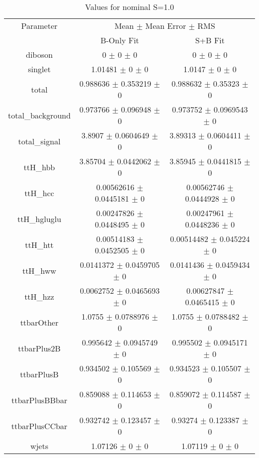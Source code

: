 \begin{table}
\centering
\caption{Values for nominal S=1.0}
\begin{tabular}{ccc}
\toprule
Parameter & \multicolumn{2}{c}{Mean $\pm$ Mean Error $\pm$ RMS}\\
 & B-Only Fit & S+B Fit\\
\midrule
diboson & \num{0} $\pm$ \num{0} $\pm$ \num{0} & \num{0} $\pm$ \num{0} $\pm$ \num{0}\\
singlet & \num{1.01481} $\pm$ \num{0} $\pm$ \num{0} & \num{1.0147} $\pm$ \num{0} $\pm$ \num{0}\\
total & \num{0.988636} $\pm$ \num{0.353219} $\pm$ \num{0} & \num{0.988632} $\pm$ \num{0.35323} $\pm$ \num{0}\\
total\_background & \num{0.973766} $\pm$ \num{0.096948} $\pm$ \num{0} & \num{0.973752} $\pm$ \num{0.0969543} $\pm$ \num{0}\\
total\_signal & \num{3.8907} $\pm$ \num{0.0604649} $\pm$ \num{0} & \num{3.89313} $\pm$ \num{0.0604411} $\pm$ \num{0}\\
ttH\_hbb & \num{3.85704} $\pm$ \num{0.0442062} $\pm$ \num{0} & \num{3.85945} $\pm$ \num{0.0441815} $\pm$ \num{0}\\
ttH\_hcc & \num{0.00562616} $\pm$ \num{0.0445181} $\pm$ \num{0} & \num{0.00562746} $\pm$ \num{0.0444928} $\pm$ \num{0}\\
ttH\_hgluglu & \num{0.00247826} $\pm$ \num{0.0448495} $\pm$ \num{0} & \num{0.00247961} $\pm$ \num{0.0448236} $\pm$ \num{0}\\
ttH\_htt & \num{0.00514183} $\pm$ \num{0.0452505} $\pm$ \num{0} & \num{0.00514482} $\pm$ \num{0.045224} $\pm$ \num{0}\\
ttH\_hww & \num{0.0141372} $\pm$ \num{0.0459705} $\pm$ \num{0} & \num{0.0141436} $\pm$ \num{0.0459434} $\pm$ \num{0}\\
ttH\_hzz & \num{0.0062752} $\pm$ \num{0.0465693} $\pm$ \num{0} & \num{0.00627847} $\pm$ \num{0.0465415} $\pm$ \num{0}\\
ttbarOther & \num{1.0755} $\pm$ \num{0.0788976} $\pm$ \num{0} & \num{1.0755} $\pm$ \num{0.0788482} $\pm$ \num{0}\\
ttbarPlus2B & \num{0.995642} $\pm$ \num{0.0945749} $\pm$ \num{0} & \num{0.995502} $\pm$ \num{0.0945171} $\pm$ \num{0}\\
ttbarPlusB & \num{0.934502} $\pm$ \num{0.105569} $\pm$ \num{0} & \num{0.934523} $\pm$ \num{0.105507} $\pm$ \num{0}\\
ttbarPlusBBbar & \num{0.859088} $\pm$ \num{0.114653} $\pm$ \num{0} & \num{0.859072} $\pm$ \num{0.114587} $\pm$ \num{0}\\
ttbarPlusCCbar & \num{0.932742} $\pm$ \num{0.123457} $\pm$ \num{0} & \num{0.93274} $\pm$ \num{0.123387} $\pm$ \num{0}\\
wjets & \num{1.07126} $\pm$ \num{0} $\pm$ \num{0} & \num{1.07119} $\pm$ \num{0} $\pm$ \num{0}\\
\bottomrule
\end{tabular}
\end{table}